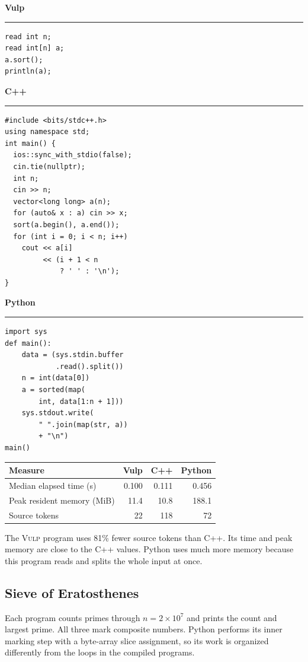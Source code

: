 \documentclass[12pt,a4paper]{report}
\newcommand{\vulp}{\textsc{Vulp}}
\begin{document}
\noindent\begin{minipage}[t]{0.315\textwidth}
\small\textbf{Vulp}\par\hrule\scriptsize
\begin{verbatim}
read int n;
read int[n] a;
a.sort();
println(a);
\end{verbatim}
\end{minipage}\hfill
\begin{minipage}[t]{0.315\textwidth}
\small\textbf{C++}\par\hrule\scriptsize
\begin{verbatim}
#include <bits/stdc++.h>
using namespace std;
int main() {
  ios::sync_with_stdio(false);
  cin.tie(nullptr);
  int n;
  cin >> n;
  vector<long long> a(n);
  for (auto& x : a) cin >> x;
  sort(a.begin(), a.end());
  for (int i = 0; i < n; i++)
    cout << a[i]
         << (i + 1 < n
             ? ' ' : '\n');
}
\end{verbatim}
\end{minipage}\hfill
\begin{minipage}[t]{0.315\textwidth}
\small\textbf{Python}\par\hrule\scriptsize
\begin{verbatim}
import sys
def main():
    data = (sys.stdin.buffer
            .read().split())
    n = int(data[0])
    a = sorted(map(
        int, data[1:n + 1]))
    sys.stdout.write(
        " ".join(map(str, a))
        + "\n")
main()
\end{verbatim}
\end{minipage}

\begin{center}\small
\begin{tabular}{|l|r|r|r|}
\hline
Measure & Vulp & C++ & Python\\\hline
Median elapsed time (s) & 0.100 & 0.111 & 0.456\\\hline
Peak resident memory (MiB) & 11.4 & 10.8 & 188.1\\\hline
Source tokens & 22 & 118 & 72\\\hline
\end{tabular}
\end{center}
\noindent The \vulp{} program uses 81\% fewer source tokens than C++. Its time and peak memory are close to the C++ values. Python uses much more memory because this program reads and splits the whole input at once.

\clearpage
\subsection{Sieve of Eratosthenes}
Each program counts primes through $n=2\times10^7$ and prints the count and largest prime. All three mark composite numbers. Python performs its inner marking step with a byte-array slice assignment, so its work is organized differently from the loops in the compiled programs.
\end{document}
